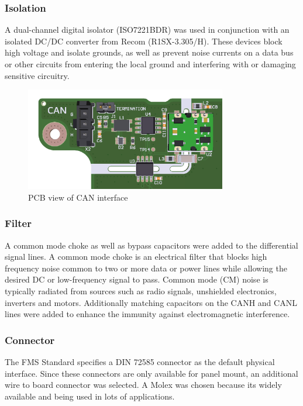 \subsubsection{Isolation}
A dual-channel digital isolator (ISO7221BDR) was used in conjunction with an isolated DC/DC converter from Recom (R1SX-3.305/H). These devices block high voltage and isolate grounds, as well as prevent noise currents on a data bus or other circuits from entering the local ground and interfering with or damaging sensitive circuitry.

\begin{figure}[h!]
	\centering
	\includegraphics[height=4.5cm]{images/can-pcb}
	\caption{PCB view of CAN interface}
	\vspace{-1.4ex}
	\label{fig:can-pcb}
\end{figure}

\subsubsection{Filter}
A common mode choke as well as bypass capacitors were added to the differential signal lines. A common mode choke is an electrical filter that blocks high frequency noise common to two or more data or power lines while allowing the desired DC or low-frequency signal to pass. Common mode (CM) noise is typically radiated from sources such as radio signals, unshielded electronics, inverters and motors. Additionally matching capacitors on the CANH and CANL lines were added to enhance the immunity against electromagnetic interference. 

\subsubsection{Connector}
The FMS Standard specifies a DIN 72585 connector as the default physical interface. Since these connectors are only available for panel mount, an additional wire to board connector was selected. A Molex  was chosen because its widely available and being used in lots of applications.\newline

